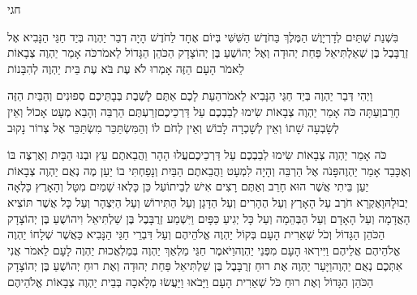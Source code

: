 \documentclass[../main/main.tex]{subfiles}
\begin{document}
\thispagestyle{empty}
\Incipit{}חגי
\cleardoublepage
\RTLmulticolcolumns
\begin{multicols*}{\ncols}
בִּשְׁנַת שְׁתַּיִם לְדָרְיָוֶשׁ הַמֶּלֶךְ בַּחֹדֶשׁ הַשִּׁשִּׁי בְּיוֹם אֶחָד לַחֹדֶשׁ הָיָה דְבַר יַהְוֶה בְּיַד חַגַּי הַנָּבִיא אֶל זְרֻבָּבֶל בֶּן שְׁאַלְתִּיאֵל פַּחַת יְהוּדָה וְאֶל יְהוֹשֻׁעַ בֶּן יְהוֹצָדָק הַכֹּהֵן הַגָּדוֹל לֵאמֹר\PreVerseSpace{}כֹּה אָמַר יַהְוֶה צְבָאוֹת לֵאמֹר הָעָם הַזֶּה אָמְרוּ לֹא עֶת בֹּא עֶת בֵּית יַהְוֶה לְהִבָּנוֹת\OpenSection{}\par
{}וַיְהִי דְּבַר יַהְוֶה בְּיַד חַגַּי הַנָּבִיא לֵאמֹר\PreVerseSpace{}הַעֵת לָכֶם אַתֶּם לָשֶׁבֶת בְּבָתֵּיכֶם סְפוּנִים וְהַבַּיִת הַזֶּה חָרֵב\PreVerseSpace{}וְעַתָּה כֹּה אָמַר יַהְוֶה צְבָאוֹת שִׂימוּ לְבַבְכֶם עַל דַּרְכֵיכֶם\PreVerseSpace{}זְרַעְתֶּם הַרְבֵּה וְהָבֵא מְעָט אָכוֹל וְאֵין לְשָׂבְעָה שָׁתוֹ וְאֵין לְשָׁכְרָה לָבוֹשׁ וְאֵין לְחֹם לוֹ וְהַמִּשְׂתַּכֵּר מִשְׂתַּכֵּר אֶל צְרוֹר נָקוּב\OpenSection{}\par
{}כֹּה אָמַר יַהְוֶה צְבָאוֹת שִׂימוּ לְבַבְכֶם עַל דַּרְכֵיכֶם\PreVerseSpace{}עֲלוּ הָהָר וַהֲבֵאתֶם עֵץ וּבְנוּ הַבָּיִת וְאֶרְצֶה בּוֹ וְאֶכָּבֵד אָמַר יַהְוֶה\PreVerseSpace{}פָּנֹה אֶל הַרְבֵּה וְהָיָה\SubEnd{} לִמְעָט וַהֲבֵאתֶם הַבַּיִת וְנָפַחְתִּי בוֹ יַעַן מֶה נְאֻם יַהְוֶה צְבָאוֹת יַעַן בֵּיתִי אֲשֶׁר הוּא חָרֵב וְאַתֶּם רָצִים אִישׁ לְבֵיתוֹ\PreVerseSpace{}עַל כֵּן  כָּלְאוּ שָׁמַיִם מִטָּל וְהָאָרֶץ כָּלְאָה יְבוּלָהּ\PreVerseSpace{}וָאֶקְרָא חֹרֶב עַל הָאָרֶץ וְעַל הֶהָרִים וְעַל הַדָּגָן וְעַל הַתִּירוֹשׁ וְעַל הַיִּצְהָר וְעַל כָּל\OmitEnd{} אֲשֶׁר תּוֹצִיא הָאֲדָמָה וְעַל הָאָדָם וְעַל הַבְּהֵמָה וְעַל כָּל יְגִיעַ כַּפָּיִם \ClosedSection{}וַיִּשְׁמַע זְרֻבָּבֶל בֶּן שַׁלְתִּיאֵל וִיהוֹשֻׁעַ בֶּן יְהוֹצָדָק הַכֹּהֵן הַגָּדוֹל וְכֹל שְׁאֵרִית הָעָם בְּקוֹל יַהְוֶה אֱלֹהֵיהֶם וְעַל דִּבְרֵי חַגַּי הַנָּבִיא כַּאֲשֶׁר שְׁלָחוֹ יַהְוֶה אֱלֹהֵיהֶם אֲלֵיהֶם\OmitEnd{} וַיִּירְאוּ הָעָם מִפְּנֵי יַהְוֶה\PreVerseSpace{}וַיֹּאמֶר חַגַּי מַלְאַךְ יַהְוֶה בְּמַלְאֲכוּת יַהְוֶה לָעָם לֵאמֹר אֲנִי אִתְּכֶם נְאֻם יַהְוֶה\PreVerseSpace{}וַיָּעַר יַהְוֶה אֶת רוּחַ זְרֻבָּבֶל בֶּן שַׁלְתִּיאֵל פַּחַת יְהוּדָה וְאֶת רוּחַ יְהוֹשֻׁעַ בֶּן יְהוֹצָדָק הַכֹּהֵן הַגָּדוֹל וְאֶת רוּחַ כֹּל שְׁאֵרִית הָעָם וַיָּבֹאוּ וַיַּעֲשׂוּ מְלָאכָה בְּבֵית יַהְוֶה צְבָאוֹת אֱלֹהֵיהֶם\OpenSection{}\par

\end{multicols*}
\end{document}
